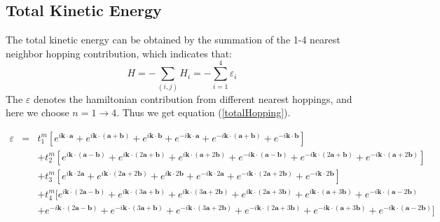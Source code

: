 \documentclass[reprint, aps, prb, showkeys]{revtex4-2}
\begin{document}
\subsection{Total Kinetic Energy}
The total kinetic energy can be obtained by the summation of the 1-4 nearest neighbor hopping contribution, which indicates that:
\begin{equation}
    H = -\sum_{(i,j)}H_i = -\sum_{i=1}^{4} \varepsilon_i
\end{equation}
The $\varepsilon$ denotes the hamiltonian contribution from different nearest hoppings, and here we choose $n = 1 \to 4$. Thus we get equation (\ref{totalHopping}).
\begin{widetext}
\begin{eqnarray}
    \varepsilon&=&t_1^m [e^{i \boldsymbol{k} \cdot \boldsymbol{a}}+e^{i \boldsymbol{k} \cdot (\boldsymbol{a} + \boldsymbol{b}) }+e^{i \boldsymbol{k} \cdot \boldsymbol{b}} + e^{-i\boldsymbol{k} \cdot \boldsymbol{a}}+e^{-i \boldsymbol{k} \cdot (\boldsymbol{a} + \boldsymbol{b}) }+e^{-i \boldsymbol{k} \cdot \boldsymbol{b}}] \nonumber\\
    &&+t_2^m[e^{i \boldsymbol{k} \cdot (\boldsymbol{a} - \boldsymbol{b})}+e^{i \boldsymbol{k} \cdot (2\boldsymbol{a} + \boldsymbol{b})}+e^{i \boldsymbol{k} \cdot (\boldsymbol{a} + 2\boldsymbol{b})} \nonumber + e^{-i \boldsymbol{k} \cdot (\boldsymbol{a} - \boldsymbol{b})}+e^{-i \boldsymbol{k} \cdot (2\boldsymbol{a} + \boldsymbol{b})}+e^{-i \boldsymbol{k} \cdot (\boldsymbol{a} + 2\boldsymbol{b})}] \nonumber\\
    &&+ t_3^m[e^{i \boldsymbol{k} \cdot 2\boldsymbol{a}}+e^{i \boldsymbol{k} \cdot (2\boldsymbol{a} + 2\boldsymbol{b})}+e^{i \boldsymbol{k} \cdot 2\boldsymbol{b}} \nonumber + e^{-i \boldsymbol{k} \cdot 2\boldsymbol{a}}+e^{-i \boldsymbol{k} \cdot (2\boldsymbol{a} + 2\boldsymbol{b})}+e^{-i \boldsymbol{k} \cdot 2\boldsymbol{b}}]\\
    &&+ t_4^m[e^{i \boldsymbol{k} \cdot (2\boldsymbol{a} - \boldsymbol{b})} + e^{i \boldsymbol{k} \cdot (3\boldsymbol{a} + \boldsymbol{b})} + e^{i \boldsymbol{k} \cdot (3\boldsymbol{a} + 2\boldsymbol{b})}+ e^{i \boldsymbol{k} \cdot (2\boldsymbol{a} + 3\boldsymbol{b})} + e^{i \boldsymbol{k} \cdot (\boldsymbol{a} + 3\boldsymbol{b})} + e^{-i \boldsymbol{k} \cdot (\boldsymbol{a} - 2\boldsymbol{b})} \nonumber\\
    &&+ e^{-i \boldsymbol{k} \cdot (2\boldsymbol{a} - \boldsymbol{b})} + e^{-i \boldsymbol{k} \cdot (3\boldsymbol{a} + \boldsymbol{b})} + e^{-i \boldsymbol{k} \cdot (3\boldsymbol{a} + 2\boldsymbol{b})}+ e^{-i \boldsymbol{k} \cdot (2\boldsymbol{a} + 3\boldsymbol{b})} + e^{-i \boldsymbol{k} \cdot (\boldsymbol{a} + 3\boldsymbol{b})} + e^{-i \boldsymbol{k} \cdot (\boldsymbol{a} - 2\boldsymbol{b})}]
    \label{totalHopping}
\end{eqnarray}    
\end{widetext}
\end{document}
